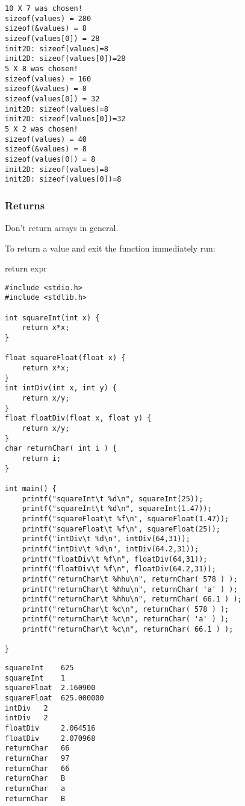\documentclass[11pt]{article}
\begin{document}
\begin{verbatim}
10 X 7 was chosen!
sizeof(values) = 280
sizeof(&values) = 8
sizeof(values[0]) = 28
init2D: sizeof(values)=8
init2D: sizeof(values[0])=28
5 X 8 was chosen!
sizeof(values) = 160
sizeof(&values) = 8
sizeof(values[0]) = 32
init2D: sizeof(values)=8
init2D: sizeof(values[0])=32
5 X 2 was chosen!
sizeof(values) = 40
sizeof(&values) = 8
sizeof(values[0]) = 8
init2D: sizeof(values)=8
init2D: sizeof(values[0])=8
\end{verbatim}

\subsubsection{Returns}
\label{sec:org859313e}

Don't return arrays in general.

To return a value and exit the function immediately run:

return expr 

\begin{verbatim}
#include <stdio.h>
#include <stdlib.h>

int squareInt(int x) {
    return x*x;
}

float squareFloat(float x) {
    return x*x;
}
int intDiv(int x, int y) {
    return x/y;
}
float floatDiv(float x, float y) {
    return x/y;
}
char returnChar( int i ) {
    return i;
}

int main() {
    printf("squareInt\t %d\n", squareInt(25));
    printf("squareInt\t %d\n", squareInt(1.47));
    printf("squareFloat\t %f\n", squareFloat(1.47));
    printf("squareFloat\t %f\n", squareFloat(25));
    printf("intDiv\t %d\n", intDiv(64,31));
    printf("intDiv\t %d\n", intDiv(64.2,31));
    printf("floatDiv\t %f\n", floatDiv(64,31));
    printf("floatDiv\t %f\n", floatDiv(64.2,31));
    printf("returnChar\t %hhu\n", returnChar( 578 ) );
    printf("returnChar\t %hhu\n", returnChar( 'a' ) );
    printf("returnChar\t %hhu\n", returnChar( 66.1 ) );
    printf("returnChar\t %c\n", returnChar( 578 ) );
    printf("returnChar\t %c\n", returnChar( 'a' ) );
    printf("returnChar\t %c\n", returnChar( 66.1 ) );

}
\end{verbatim}

\begin{verbatim}
squareInt	 625
squareInt	 1
squareFloat	 2.160900
squareFloat	 625.000000
intDiv	 2
intDiv	 2
floatDiv	 2.064516
floatDiv	 2.070968
returnChar	 66
returnChar	 97
returnChar	 66
returnChar	 B
returnChar	 a
returnChar	 B
\end{verbatim}
\end{document}
